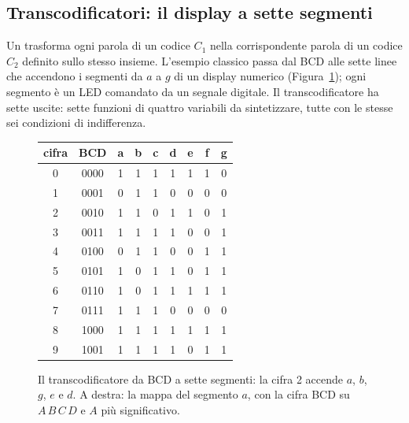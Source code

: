 \subsection{Transcodificatori: il display a sette segmenti}

Un  trasforma ogni parola di un codice $C_1$ nella
corrispondente parola di un codice $C_2$ definito sullo stesso insieme.
L'esempio classico passa dal BCD alle sette linee che accendono i segmenti da
$a$ a $g$ di un display numerico (Figura~\ref{fig:cm:seg}); ogni segmento è un
LED comandato da un segnale digitale. Il transcodificatore ha sette uscite:
sette funzioni di quattro variabili da sintetizzare, tutte con le stesse sei
condizioni di indifferenza.

\begin{figure}[htb]
\centering
\begin{minipage}{0.22\textwidth}\centering
{}
\end{minipage}
\begin{minipage}{0.38\textwidth}\centering\scriptsize\ttfamily\setlength{\tabcolsep}{2.6pt}
\begin{tabular}{cc|ccccccc}
\textrm{cifra}&\textrm{BCD}&a&b&c&d&e&f&g\\\hline
0&0000&1&1&1&1&1&1&0\\1&0001&0&1&1&0&0&0&0\\\rowcolor{prgred!12}2&0010&1&1&0&1&1&0&1\\3&0011&1&1&1&1&0&0&1\\4&0100&0&1&1&0&0&1&1\\
5&0101&1&0&1&1&0&1&1\\6&0110&1&0&1&1&1&1&1\\7&0111&1&1&1&0&0&0&0\\8&1000&1&1&1&1&1&1&1\\9&1001&1&1&1&1&0&1&1
\end{tabular}
\end{minipage}
\begin{minipage}{0.36\textwidth}\centering
{}
\end{minipage}
\caption{Il transcodificatore da BCD a sette segmenti: la cifra 2 accende $a$,
$b$, $g$, $e$ e $d$. A destra: la mappa del segmento $a$, con la cifra BCD su
$A\,B\,C\,D$ e $A$ più significativo.}
\label{fig:cm:seg}
\end{figure}

